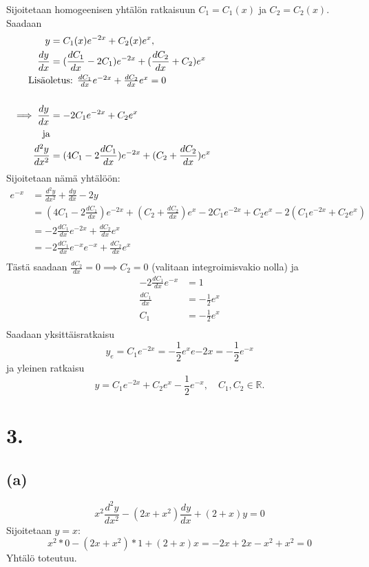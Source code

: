 \documentclass{article}
\begin{document}
Sijoitetaan homogeenisen yhtälön ratkaisuun $C_1 = C_1(x)$ ja $C_2 = C_2(x)$.
Saadaan
\begin{align*}
  y &= C_1(x)e^{-2x} + C_2(x)e^{x}, \\
  \frac{dy}{dx} &= (\frac{dC_1}{dx} - 2C_1)e^{-2x} + (\frac{dC_2}{dx} + C_2)e^x \\
  \noalign{\text{Lisäoletus: $\frac{dC_1}{dx}e^{-2x} + \frac{dC_2}{dx}e^x = 0$}} \\
  \implies \frac{dy}{dx} &= -2C_1e^{-2x} + C_2e^x \\
  \text{ja} \\
  \frac{d^2 y}{d x^2} &= (4C_1 - 2\frac{dC_1}{dx})e^{-2x} + (C_2 + \frac{dC_2}{dx})e^x \\
\end{align*}
Sijoitetaan nämä yhtälöön:
\begin{align*}
  e^{-x} &= \frac{d^2 y}{d x^2} + \frac{dy}{dx} - 2y \\
         &= (4C_1 - 2\frac{dC_1}{dx})e^{-2x} + (C_2 + \frac{dC_2}{dx})e^x
          - 2C_1e^{-2x} + C_2e^x
          - 2(C_1e^{-2x} + C_2e^{x}) \\
         &= -2\frac{dC_1}{dx}e^{-2x} + \frac{dC_2}{dx}e^x \\
         &= -2\frac{dC_1}{dx}e^{-x}e^{-x} + \frac{dC_2}{dx}e^x \\
\end{align*}
Tästä saadaan $\frac{dC_2}{dx} = 0 \implies C_2 = 0$ (valitaan integroimisvakio nolla)
ja
\begin{align*}
  -2\frac{dC_1}{dx}e^{-x} &= 1 \\
  \frac{dC_1}{dx} &= -\frac{1}{2}e^x \\
  C_1 &= -\frac{1}{2}e^x \\
\end{align*}
Saadaan yksittäisratkaisu
\[
  y_e = C_1e^{-2x} = -\frac{1}{2}e^xe{-2x} = -\frac{1}{2}e^{-x}
\]
ja yleinen ratkaisu
\[
  y = C_1e^{-2x} + C_2e^{x} - \frac{1}{2}e^{-x}, \quad C_1,C_2 \in \mathbb{R}.
\]

\section*{3.}

\subsection*{(a)}

\[
  x^2\frac{d^2 y}{d x^2} - (2x + x^2)\frac{dy}{dx} + (2 + x)y = 0
\]
Sijoitetaan $y = x$:
\[
  x^2*0 - (2x + x^2)*1 + (2 + x)x = -2x + 2x - x^2 + x^2 = 0
\]
Yhtälö toteutuu.
\end{document}
